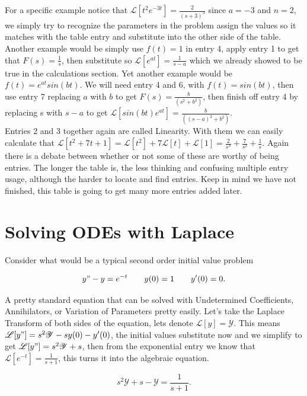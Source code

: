 \documentclass[12pt]{article}
\newcommand{\lp}{\mathscr{L}}
\newcommand{\hugey}{\mathscr{Y}}
\begin{document}
For a specific example notice that $\lp[t^2 e^{-3t}]=\frac{2}{(s+3)^3}$ since $a=-3$ and $n=2$, we simply try to recognize the parameters in the problem assign the values so it matches with the table entry and substitute into the other side of the table. \\

Another example would be simply use $f(t)=1$ in entry 4, apply entry 1 to get that $F(s)=\frac{1}{s}$, then substitute so $\lp[e^{at}]=\frac{1}{s-a}$ which we already showed to be true in the calculations section. Yet another example would be $f(t)=e^{at} sin(bt)$. We will need entry 4 and 6, with $f(t)=sin(bt)$, then use entry 7 replacing $a$ with $b$ to get $F(s)=\frac{b}{(s^2+b^2)}$, then finish off entry 4 by replacing s with $s-a$ to get $\lp[sin(bt) e^{at}]=\frac{b}{((s-a)^2+b^2)}$. \\

Entries 2 and 3 together again are called Linearity. With them we can easily calculate that $\lp[t^2+7t+1]=\lp[t^2]+7\lp[t]+\lp[1]=\frac{2}{s^3}+\frac{7}{s^2}+\frac{1}{s}$. Again there is a debate between whether or not some of these are worthy of being entries. The longer the table is, the less thinking and confusing multiple entry usage, although the harder to locate and find entries. Keep in mind we have not finished, this table is going to get many more entries added later.

\section{Solving ODEs with Laplace}

Consider what would be a typical second order initial value problem

\begin{equation*}
    y"-y=e^{-t} \qquad y(0)=1 \qquad y'(0)=0.
\end{equation*}

A pretty standard equation that can be solved with Undetermined Coefficients, Annihilators, or Variation of Parameters pretty easily. Let's take the Laplace Transform of both sides of the equation, lets denote $\lp [y]=\hugey$. This means $\lp [y"]=s^2\hugey - sy(0) - y'(0)$, the initial values substitute now and we simplify to get $\lp [y"]=s^2\hugey + s$, then from the exponential entry we know that $\lp [e^{-t}]=\frac{1}{s+1}$, this turns it into the algebraic equation.

\begin{equation*}
    s^2\hugey + s - \hugey = \frac{1}{s+1}.
\end{equation*}
\end{document}
